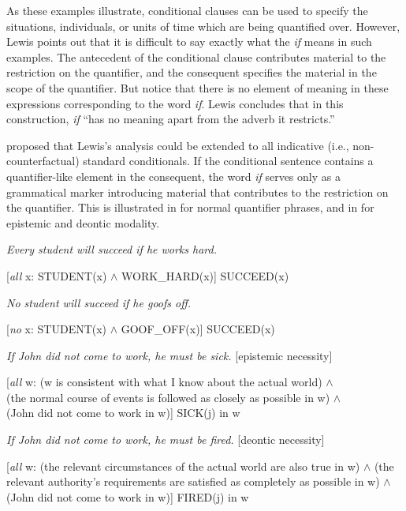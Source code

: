 As these examples illustrate, conditional clauses can be used to specify the situations, individuals, or units of time which are being quantified over. However, Lewis points out that it is difficult to say exactly what the \textit{if} means in such examples. The antecedent of the conditional clause contributes material to the restriction on the quantifier, and the consequent specifies the material in the scope of the quantifier. But notice that there is no element of meaning in these expressions corresponding to the word \textit{if}. Lewis concludes that in this construction, \textit{if} “has no meaning apart from the adverb it restricts.”


\citet{Kratzer1986} proposed that Lewis’s analysis could be extended to all indicative (i.e., non-counterfactual) standard conditionals. If the conditional sentence contains a quantifier-like element in the consequent, the word \textit{if} serves only as a grammatical marker introducing material that contributes to the restriction on the quantifier. This is illustrated in  for normal quantifier phrases, and in  for epistemic and deontic modality.


\ea \label{ex:19.29}
\ea   \textit{Every student will succeed if he works hard.}\\
\smallskip
  
{}[\textit{all} x: STUDENT(x) $\wedge$ WORK\_HARD(x)] SUCCEED(x)

\ex  \textit{No student will succeed if he goofs off.}\\
\smallskip
  
{}[\textit{no} x: STUDENT(x) $\wedge$ GOOF\_OFF(x)] SUCCEED(x)
\z \z

\ea \label{ex:19.30}
\ea  \textit{ If John did not come to work, he must be sick.}  [epistemic necessity]\\
  \smallskip

  {}[\textit{all} w: (w is consistent with what I know about the actual world) $\wedge$\\
  (the normal course of events is followed as closely as possible in w) $\wedge$\\
  (John did not come to work in w)] SICK(j) in w
  
\ex  \textit{If John did not come to work, he must be fired.}  [deontic necessity]\\
  \smallskip
  
  {}[\textit{all} w: (the relevant circumstances of the actual world are also true in w) $\wedge$
  (the relevant authority’s requirements are satisfied as completely as possible in w) $\wedge$
  (John did not come to work in w)] FIRED(j) in w
\z \z


